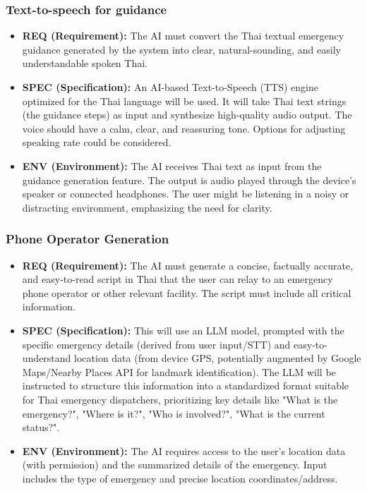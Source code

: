 \subsubsection{Text-to-speech for guidance}
\label{ssubsec:req_tts_guidance}
\begin{itemize}
    \item \textbf{REQ (Requirement):} The AI must convert the Thai textual emergency guidance generated by the system into clear, natural-sounding, and easily understandable spoken Thai.
    \item \textbf{SPEC (Specification):} An AI-based Text-to-Speech (TTS) engine optimized for the Thai language will be used. It will take Thai text strings (the guidance steps) as input and synthesize high-quality audio output. The voice should have a calm, clear, and reassuring tone. Options for adjusting speaking rate could be considered.
    \item \textbf{ENV (Environment):} The AI receives Thai text as input from the guidance generation feature. The output is audio played through the device's speaker or connected headphones. The user might be listening in a noisy or distracting environment, emphasizing the need for clarity.
\end{itemize}

\subsubsection{Phone Operator Generation}
\label{ssubsec:req_phone_operator}
\begin{itemize}
    \item \textbf{REQ (Requirement):} The AI must generate a concise, factually accurate, and easy-to-read script in Thai that the user can relay to an emergency phone operator or other relevant facility. The script must include all critical information.
    \item \textbf{SPEC (Specification):} This will use an LLM model, prompted with the specific emergency details (derived from user input/STT) and easy-to-understand location data (from device GPS, potentially augmented by Google Maps/Nearby Places API for landmark identification). The LLM will be instructed to structure this information into a standardized format suitable for Thai emergency dispatchers, prioritizing key details like "What is the emergency?", "Where is it?", "Who is involved?", "What is the current status?".
    \item \textbf{ENV (Environment):} The AI requires access to the user's location data (with permission) and the summarized details of the emergency. Input includes the type of emergency and precise location coordinates/address.
\end{itemize}

